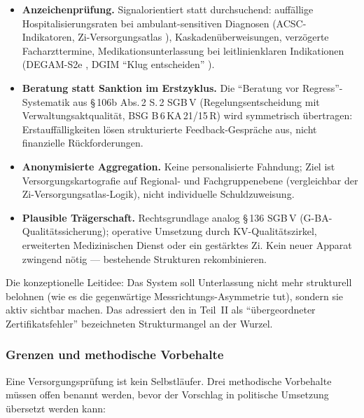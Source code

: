 \documentclass{umbruch-position}
\begin{document}
\begin{itemize}[nosep]
  \item \textbf{Anzeichen\-prüfung.} Signalorientiert statt durchsuchend: auffällige Hospitalisierungsraten bei ambulant-sensitiven Diagnosen (ACSC-Indikatoren, Zi-Versorgungsatlas \cite{zi_versorgungsatlas}), Kaskaden\-überweisungen, verzögerte Facharzttermine, Medikations\-unterlassung bei leitlinien\-klaren Indikationen (DEGAM-S2e \cite{degam_s2e_ueberversorgung}, DGIM ``Klug entscheiden'' \cite{dgim_klug_entscheiden}).
  \item \textbf{Beratung statt Sanktion im Erstzyklus.} Die ``Beratung vor Regress''-Systematik aus \S\,106b Abs.\,2 S.\,2 SGB\,V (Regelungsentscheidung mit Verwaltungsaktqualität, BSG B\,6\,KA\,21/15\,R) wird symmetrisch übertragen: Erstauffälligkeiten lösen strukturierte Feedback-Gespräche aus, nicht finanzielle Rückforderungen.
  \item \textbf{Anonymisierte Aggregation.} Keine personalisierte Fahndung; Ziel ist Versorgungs\-kartografie auf Regional- und Fachgruppen\-ebene (vergleichbar der Zi-Versorgungsatlas-Logik), nicht individuelle Schuldzuweisung.
  \item \textbf{Plausible Trägerschaft.} Rechtsgrundlage analog \S\,136 SGB\,V (G-BA-Qualitätssicherung); operative Umsetzung durch KV-Qualitäts\-zirkel, erweiterten Medizinischen Dienst oder ein gestärktes Zi. Kein neuer Apparat zwingend nötig --- bestehende Strukturen rekombinieren.
\end{itemize}

Die konzeptionelle Leitidee: Das System soll Unterlassung nicht mehr strukturell belohnen (wie es die gegenwärtige Messrichtungs-Asymmetrie tut), sondern sie aktiv sichtbar machen. Das adressiert den in Teil~II als ``übergeordneter Zertifikatsfehler'' bezeichneten Strukturmangel an der Wurzel.

\subsubsection{Grenzen und methodische Vorbehalte}
\label{subsubsec:versorgungspruefung_grenzen}

Eine Versorgungsprüfung ist kein Selbstläufer. Drei methodische Vorbehalte müssen offen benannt werden, bevor der Vorschlag in politische Umsetzung übersetzt werden kann:
\end{document}
